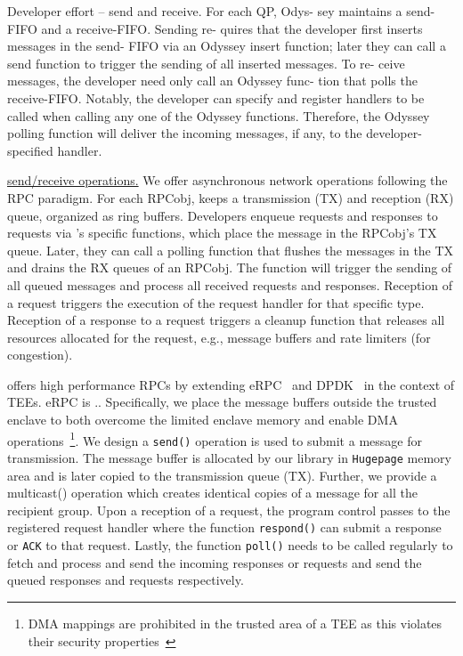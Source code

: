 Developer effort – send and receive. For each QP, Odys-
sey maintains a send-FIFO and a receive-FIFO. Sending re-
quires that the developer first inserts messages in the send-
FIFO via an Odyssey insert function; later they can call a send
function to trigger the sending of all inserted messages. To re-
ceive messages, the developer need only call an Odyssey func-
tion that polls the receive-FIFO. Notably, the developer can
specify and register handlers to be called when calling any
one of the Odyssey functions. Therefore, the Odyssey polling
function will deliver the incoming messages, if any, to the
developer-specified handler.
\fi





\noindent\underline{send/receive operations.} We offer asynchronous network operations following the RPC paradigm. For each RPCobj, \projecttitle{} keeps a transmission (TX) and reception (RX) queue, organized as ring buffers. Developers enqueue requests and responses to requests via \projecttitle{}'s specific functions, which place the message in the RPCobj's TX queue. Later, they can call a polling function that flushes the messages in the TX and drains the RX queues of an RPCobj. The function will trigger the sending of all queued messages and process all received requests and responses. Reception of a request triggers the execution of the request handler for that specific type. Reception of a response to a request triggers a cleanup function that releases all resources allocated for the request, e.g., message buffers and rate limiters (for congestion). %

\projecttitle{} offers high performance RPCs by extending eRPC~\cite{erpc} and DPDK~\cite{dpdk} in the context of TEEs. eRPC is .. Specifically, we place the message buffers outside the trusted enclave to both overcome the limited enclave memory and enable DMA operations~\footnote{DMA mappings are prohibited in the trusted area of a TEE as this violates their security properties~\cite{intel-sgx}}. We design a \texttt{send()} operation is used to submit a message for transmission. The message buffer is allocated by our library in \texttt{Hugepage} memory area and is later copied to the transmission queue (TX). Further, we provide a multicast() operation which creates identical copies of a message for all the recipient group.    Upon a reception of a request, the program control passes to the registered request handler where the function \texttt{respond()} can submit a response or \texttt{ACK} to that request. Lastly, the function \texttt{poll()} needs to be called regularly to fetch and process and send the incoming responses or requests and send the queued responses and requests respectively. 
\fi




